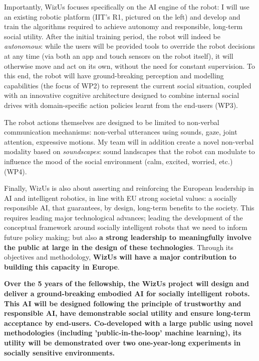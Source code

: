 \documentclass[11pt,a4paper]{report}
\newcommand{\project}{WizUs\xspace}
\begin{document}
Importantly, \project focuses specifically on the AI engine of the robot: I will
use an existing robotic platform (IIT's R1, pictured on the left) and develop and train the
algorithms required to achieve autonomy and responsible, long-term social utility. After the
initial training period, the robot will indeed be \emph{autonomous}: while the
users will be provided tools to override the robot decisions at any time (via
both an app and touch sensors on the robot itself), it will otherwise
move and act on its own, without the need for constant supervision. To this end,
the robot will have ground-breaking perception and modelling capabilities (the
focus of WP2) to represent the current social situation, coupled with an
innovative cognitive architecture designed to combine internal social
drives with domain-specific action policies learnt from the end-users (WP3).

The robot actions themselves are designed to be limited to non-verbal
communication mechanisms: non-verbal utterances using sounds, gaze, joint
attention, expressive motions. My team will in addition create a novel
non-verbal modality based on \emph{soundscapes}: sound landscapes that the robot
can modulate to influence the mood of the social environment (calm, excited,
worried, etc.) (WP4).

Finally, \project is also about asserting and reinforcing the European
leadership in AI and intelligent robotics, in line with EU strong societal
values: a socially responsible AI, that guarantees, by design, long-term
benefits to the society. This requires leading major technological advances;
leading the development of the conceptual framework around socially intelligent
robots that we need to inform future policy making; but also \textbf{a strong
leadership to meaningfully involve the public at large in the design of these
technologies}. Through its objectives and methodology, \textbf{\project will
have a major contribution to building this capacity in Europe}. 

\begin{framed}

\bf Over the 5 years of the fellowship, the
\project project will design and deliver a ground-breaking embodied AI for
socially intelligent robots. This AI will be designed following the principle of
trustworthy and responsible AI, have
demonstrable social utility and ensure long-term acceptance by end-users.
Co-developed with a large public using novel methodologies (including 'public-in-the-loop'
machine learning), its utility will be demonstrated over two one-year-long experiments in
socially sensitive environments.

\end{framed}
\end{document}
